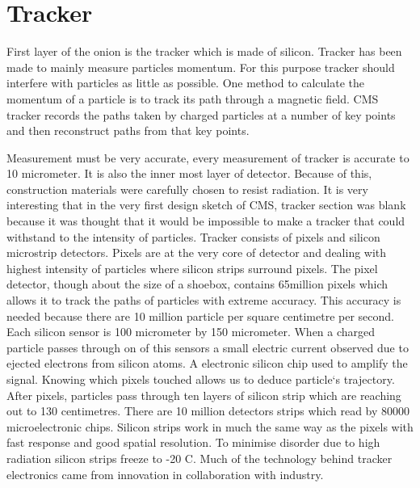 \documentclass[a4paper,10pt]{article}
\begin{document}
\section{Tracker}

First layer of the onion is the tracker which is made of silicon. Tracker has been made to mainly measure particles momentum. For this purpose tracker should interfere with particles
as little as possible. One method to calculate the momentum of a particle is to track its path through a magnetic field. CMS tracker records the paths taken by charged particles 
at a number of key points and then reconstruct paths from that key points.

Measurement must be very accurate, every measurement of tracker is accurate to 10 micrometer. 
It is also the inner most layer of detector. Because of this, construction materials were carefully chosen to resist radiation. It is very interesting that in the very 
first design sketch of CMS, tracker section was blank because it was thought that it would be impossible to make a tracker that could withstand to the intensity of particles.
Tracker consists of pixels and silicon microstrip detectors. Pixels are at the very core of detector and dealing with highest intensity of particles where silicon strips surround pixels. 
The pixel detector, though about the size of a shoebox, contains 65million pixels which allows it to track the paths of particles with extreme accuracy. This accuracy is needed because there 
are 10 million particle per square centimetre per second. Each silicon sensor is 100 micrometer by 150 micrometer. When a charged particle passes through on of this sensors a small electric current
observed due to ejected electrons from silicon atoms. A electronic silicon chip used to amplify the signal. Knowing which pixels touched allows us to deduce particle`s trajectory.
After pixels, particles pass through ten layers of silicon strip which are reaching out to 130 centimetres. There are 10 million detectors strips which read by 80000 microelectronic chips.
Silicon strips work in much the same way as the pixels with fast response and good spatial resolution. To minimise disorder due to high radiation silicon strips freeze to -20 C. Much of the
technology behind tracker electronics came from innovation in collaboration with industry.
\end{document}
